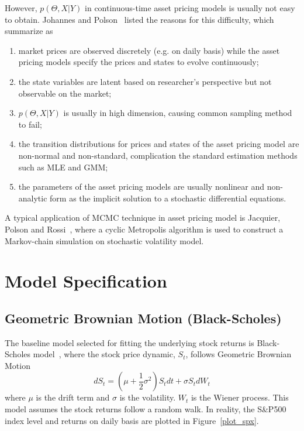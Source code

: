\documentclass[11pt,reqno,final]{amsart}
\begin{document}
However, $p(\Theta, X|Y)$ in continuous-time asset pricing models is usually not easy to obtain. Johannes and Polson~\cite{JP02} listed the reasons for this difficulty, which summarize as
\begin{enumerate}
    \item market prices are observed discretely (e.g. on daily basis) while the asset pricing models specify the prices and states to evolve continuously;
    \item the state variables are latent based on researcher's perspective but not observable on the market;
    \item $p(\Theta, X|Y)$ is usually in high dimension, causing common sampling method to fail;
    \item the transition distributions for prices and states of the asset pricing model are non-normal and non-standard, complication the standard estimation methods such as MLE and GMM;
    \item the parameters of the asset pricing models are usually nonlinear and non-analytic form as the implicit solution to a stochastic differential equations.
\end{enumerate}

A typical application of MCMC technique in asset pricing model is Jacquier, Polson and Rossi~\cite{JPR94}, where a cyclic Metropolis algorithm is used to construct a Markov-chain simulation on stochastic volatility model.


\section{Model Specification}
\subsection{Geometric Brownian Motion (Black-Scholes)}
The baseline model selected for fitting the underlying stock returns is Black-Scholes model~\cite{BS73}, where the stock price dynamic, $S_t$, follows Geometric Brownian Motion
$$
d S_t = \left(\mu+\frac{1}{2}\sigma^2\right) S_t dt + \sigma S_t dW_t
$$
where $\mu$ is the drift term and $\sigma$ is the volatility. $W_t$ is the Wiener process. This model assumes the stock returns follow a random walk. In reality, the S\&P500 index level and returns on daily basis are plotted in Figure~\ref{plot_spx}.
\end{document}
